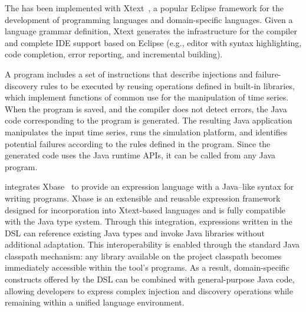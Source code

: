 





The \tool has been implemented with Xtext~\citep{10.5555/3074444}, a popular Eclipse framework for the development of programming languages and domain-specific languages. Given a language grammar definition, Xtext generates the infrastructure for the compiler and complete IDE support based on Eclipse (e.g., editor with syntax highlighting, code completion, error reporting, and incremental building).

A \tool program includes a set of instructions that describe injections and failure-discovery rules to be executed by reusing operations defined in built-in libraries, which implement functions of common use for the manipulation of time series. When the \tool program is saved, and the compiler does not detect errors, the Java code corresponding to the \tool program is generated. The resulting Java application manipulates the input time series, runs the simulation platform, and identifies potential failures according to the rules defined in the \tool program. Since the generated code uses the \tool Java runtime APIs, it can be called from any Java program.

\tool integrates Xbase~\citep{efftinge2012xbase} to provide an expression language with a Java--like syntax for writing \tool programs. Xbase is an extensible and reusable expression framework designed for incorporation into Xtext-based languages and is fully compatible with the Java type system. Through this integration, expressions written in the DSL can reference existing Java types and invoke Java libraries without additional adaptation. This interoperability is enabled through the standard Java classpath mechanism: any library available on the project classpath becomes immediately accessible within the tool’s programs. As a result, domain-specific constructs offered by the DSL can be combined with general-purpose Java code, allowing developers to express complex injection and discovery operations while remaining within a unified language environment.


